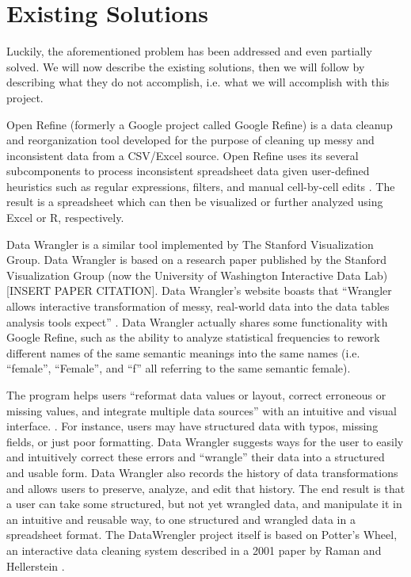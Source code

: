 \documentclass{../sty/acm_proc_article-sp}
\begin{document}
\section{Existing Solutions}
Luckily, the aforementioned problem has been addressed and even partially solved. We will now describe the existing solutions, then we will follow by describing what they do not accomplish, i.e. what we will accomplish with this project.

Open Refine (formerly a Google project called Google Refine) is a data cleanup and reorganization tool developed for the purpose of cleaning up messy and inconsistent data from a CSV/Excel source. Open Refine uses its several subcomponents to process inconsistent spreadsheet data given user-defined heuristics such as regular expressions, filters, and manual cell-by-cell edits \cite{Refine}. The result is a spreadsheet which can then be visualized or further analyzed using Excel or R, respectively.

Data Wrangler is a similar tool implemented by The Stanford Visualization Group. Data Wrangler is based on a research paper published by the Stanford Visualization Group (now the University of Washington Interactive Data Lab) [INSERT PAPER CITATION]. Data Wrangler's website boasts that ``Wrangler allows interactive transformation of messy, real-world data into the data tables analysis tools expect'' \cite{wrangler-web}. Data Wrangler actually shares some functionality with Google Refine, such as the ability to analyze statistical frequencies to rework different names of the same semantic meanings into the same names (i.e. ``female'', ``Female'', and ``f'' all referring to the same semantic female).

The program helps users ``reformat data values or layout, correct erroneous or missing values, and integrate multiple data sources'' with an intuitive and visual interface. \cite{2011-wrangler}. For instance, users may have structured data with typos, missing fields, or just poor formatting. Data Wrangler suggests ways for the user to easily and intuitively correct these errors and ``wrangle'' their data into a structured and usable form. Data Wrangler also records the history of data transformations and allows users to preserve, analyze, and edit that history. The end result is that a user can take some structured, but not yet wrangled data, and manipulate it in an intuitive and reusable way, to one structured and wrangled data in a spreadsheet format.
The DataWrengler project itself is based on Potter's Wheel, an interactive data cleaning system described in a 2001 paper by Raman and Hellerstein \cite{raman2001potter}.
\end{document}
